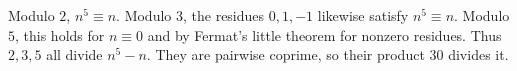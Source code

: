 Modulo $2$, $n^5\equiv n$. Modulo $3$, the residues $0,1,-1$ likewise satisfy $n^5\equiv n$. Modulo $5$, this holds for $n\equiv0$ and by Fermat's little theorem for nonzero residues. Thus $2,3,5$ all divide $n^5-n$. They are pairwise coprime, so their product $\boxed{30}$ divides it.
